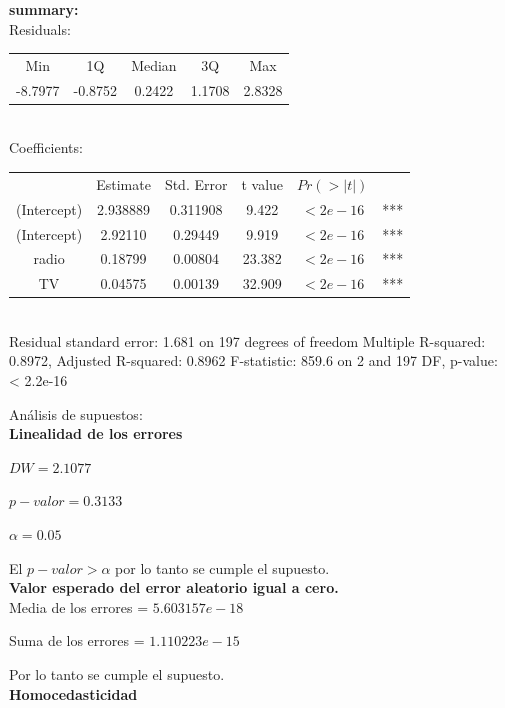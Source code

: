 \documentclass[12pt,a4paper]{article}
\begin{document}
	{\bf summary: }\\
	
	Residuals:\\
	
	\begin{tabular}{ccccc}
		Min&     1Q& Median& 3Q&    Max\\
		-8.7977& -0.8752&  0.2422&  1.1708&  2.8328 
	\end{tabular}\\ 
	
	Coefficients:\\
	
	\begin{tabular}{cccccc}
		&     Estimate & Std. Error&     t value&   $Pr(>|t|)$&\\
		(Intercept) & 2.938889 &  0.311908 &  9.422  & $<2e-16$ &***\\
		(Intercept) & 2.92110  &  0.29449  & 9.919   & $<2e-16$ &***\\
		radio       & 0.18799  &  0.00804  & 23.382  & $<2e-16$ &***\\
		TV          & 0.04575  &  0.00139  & 32.909  & $<2e-16$ &***\\
	\end{tabular}\\
	
	Residual standard error: 1.681 on 197 degrees of freedom
	Multiple R-squared:  0.8972,	Adjusted R-squared:  0.8962 
	F-statistic: 859.6 on 2 and 197 DF,  p-value: < 2.2e-16
	
	Análisis de supuestos:\\
	
	\textbf{Linealidad de los errores}
	\begin{center}
		$DW = 2.1077$
		
		$p-valor = 0.3133$
		
		$\alpha = 0.05$
	\end{center}

	El $p-valor > \alpha$ por lo tanto se cumple el supuesto.\\
	
	\textbf{Valor esperado del error aleatorio igual a cero.}\\
	
	Media de los errores = $5.603157e-18$
	
	Suma de los errores = $1.110223e-15$
	
	Por lo tanto se cumple el supuesto.\\
	
	\textbf{Homocedasticidad}
	
\end{document}
